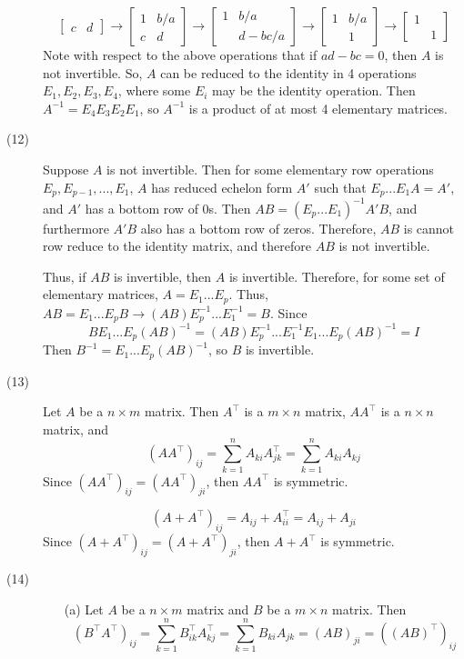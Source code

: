 \begin{description}
$$\begin{bmatrix}
c & d
\end{bmatrix} \rightarrow \begin{bmatrix}
1 & b/a \\
c & d
\end{bmatrix} \rightarrow \begin{bmatrix}
1 & b/a \\
& d - bc/a
\end{bmatrix} \rightarrow \begin{bmatrix}
1 & b/a \\
& 1
\end{bmatrix} \rightarrow \begin{bmatrix}
1 & \\
& 1
\end{bmatrix}$$
Note with respect to the above operations that if $ad - bc = 0$, then $A$ is not invertible. So, $A$ can be reduced to the identity in 4 operations $E_1, E_2, E_3, E_4$, where some $E_i$ may be the identity operation. Then $A^{-1} = E_4E_3E_2E_1$, so $A^{-1}$ is a product of at most 4 elementary matrices.
\item[(12)]
Suppose $A$ is not invertible. Then for some elementary row operations $E_p, E_{p-1}, ..., E_1$, $A$ has reduced echelon form $A'$ such that $E_p...E_1A = A'$, and $A'$ has a bottom row of 0s. Then $AB = (E_p...E_1)^{-1}A'B$, and furthermore $A'B$ also has a bottom row of zeros. Therefore, $AB$ is cannot row reduce to the identity matrix, and therefore $AB$ is not invertible.

Thus, if $AB$ is invertible, then $A$ is invertible. Therefore, for some set of elementary matrices, $A = E_1...E_p$. Thus, $AB = E_1...E_pB \rightarrow (AB)E_p^{-1}...E_1^{-1} = B$. Since 
$$BE_1...E_p(AB)^{-1} =(AB)E_p^{-1}...E_1^{-1}E_1...E_p(AB)^{-1} = I$$
Then $B^{-1} = E_1...E_p(AB)^{-1}$, so $B$ is invertible.
\item[(13)]
Let $A$ be a $n \times m$ matrix. Then $A^\top$ is a $m \times n$ matrix, $AA^\top$ is a $n \times n$ matrix, and
$$(AA^\top)_{ij} = \sum_{k=1}^n A_{ki}A^\top_{jk} = \sum_{k=1}^n A_{ki}A_{kj}$$
Since $(AA^\top)_{ij} = (AA^\top)_{ji}$, then $AA^\top$ is symmetric.

$$(A + A^\top)_{ij} = A_{ij} + A^\top_{ii} = A_{ij} + A_{ji}$$
Since $(A + A^\top)_{ij} = (A + A^\top)_{ji}$, then $A + A^\top$ is symmetric.
\item[(14)]
\begin{itemize}
\item[(a)] 
Let $A$ be a $n \times m$ matrix and $B$ be a $m \times n$ matrix. Then
$$(B^\top A^\top)_{ij} = \sum_{k=1}^n B^\top_{ik}A^\top_{kj} = \sum_{k=1}^n B_{ki}A_{jk} = (AB)_{ji} = ((AB)^\top)_{ij}$$


\end{itemize}
\end{description}
